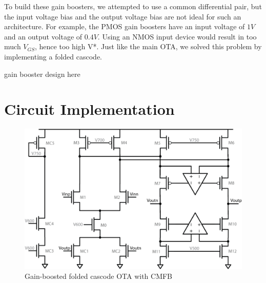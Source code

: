 \documentclass[conference]{IEEEtran}
\begin{document}
To build these gain boosters, we attempted to use a common differential pair, but the input voltage bias and the output voltage bias are not ideal for such an architecture. For example, the PMOS gain boosters have an input voltage of $1V$ and an output voltage of $0.4V$. Using an NMOS input device would result in too much $V_{GS}$, hence too high V*. Just like the main OTA, we solved this problem by implementing a folded cascode.

gain booster design here


\section{Circuit Implementation}

\begin{figure}[h]
\centering
\includegraphics[width=\linewidth]{illus/main_ota}
\caption{Gain-boosted folded cascode OTA with CMFB}
\label{fig:main-ota}
\end{figure}
\end{document}
